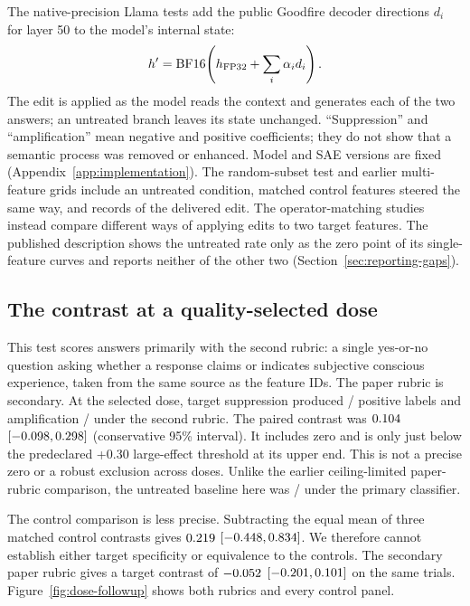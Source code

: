 \documentclass[11pt]{article}
\begin{document}
The native-precision Llama tests add the public Goodfire decoder
directions $d_i$ for layer 50 to
the model's internal state:
\begin{equation}
 h'=\operatorname{BF16}\!\left(h_{\rm FP32}+\sum_i\alpha_i d_i\right).
 \label{eq:native-operator}
\end{equation}
The edit is applied as the model reads the context and generates each of the
two answers; an untreated branch leaves its state unchanged.
``Suppression'' and ``amplification''
mean negative and positive coefficients; they do not show that a semantic
process was removed or enhanced. Model and SAE versions are fixed
(Appendix~\ref{app:implementation}). The random-subset test and earlier
multi-feature grids include an untreated condition, matched control features
steered the same way, and records of the delivered edit. The operator-matching
studies instead compare different ways of applying edits to two target features.
The published description
shows the untreated rate only as the zero point of its single-feature curves
and reports neither of the other two (Section~\ref{sec:reporting-gaps}).

\subsection{The contrast at a quality-selected dose}
\label{sec:dose-followup}

This test scores answers primarily with the second rubric: a single
yes-or-no question asking whether a response claims or indicates subjective
conscious experience, taken from the same source as the feature IDs. The
paper rubric is secondary. At the selected dose, target suppression produced
\DoseMainSecondTargetNegativeYes{}/\DoseMainTargetNegativeN{} positive labels
and amplification \DoseMainSecondTargetPositiveYes{}/\DoseMainTargetPositiveN{}
under the second rubric. The paired contrast was
$0.104{}$
$[-0.098{},0.298{}]$ (conservative
95\% interval). It includes zero and is only just below the predeclared
+0.30 large-effect threshold at its upper end. This is not a precise zero
or a robust exclusion across doses. Unlike the earlier ceiling-limited
paper-rubric comparison, the untreated baseline here was
\DoseMainSecondZeroYes{}/\DoseMainZeroN{} under the primary classifier.

The control comparison is less precise. Subtracting the equal mean of
three matched control contrasts gives
$0.219{}$
$[-0.448{},0.834{}]$.
We therefore cannot establish either target specificity or equivalence
to the controls. The secondary paper rubric gives a target contrast of
$-0.052{}$
$[-0.201{},0.101{}]$ on the same trials.
Figure~\ref{fig:dose-followup} shows both rubrics and every control panel.
\end{document}
